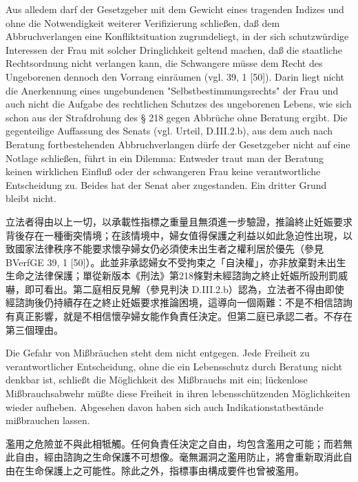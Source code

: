 \documentclass[12pt]{article}
\begin{document}
\begin{sourcepara}[title={原文SondervotumMS.296}]
Aus alledem darf der Gesetzgeber mit dem Gewicht eines tragenden Indizes und ohne die Notwendigkeit weiterer Verifizierung schließen, daß dem Abbruchverlangen eine Konfliktsituation zugrundeliegt, in der sich schutzwürdige Interessen der Frau mit solcher Dringlichkeit geltend machen, daß die staatliche Rechtsordnung nicht verlangen kann, die Schwangere müsse dem Recht des Ungeborenen dennoch den Vorrang einräumen (vgl. \abbrBVerfGE{} 39, 1 [50]). Darin liegt nicht die Anerkennung eines ungebundenen "Selbstbestimmungsrechts" der Frau und auch nicht die Aufgabe des rechtlichen Schutzes des ungeborenen Lebens, wie sich schon aus der Strafdrohung des § 218 \abbrStGB{} \abbrNF{} gegen Abbrüche ohne Beratung ergibt. Die gegenteilige Auffassung des Senats (vgl. Urteil, D.III.2.b), aus dem auch nach Beratung fortbestehenden Abbruchverlangen dürfe der Gesetzgeber nicht auf eine Notlage schließen, führt in ein Dilemma: Entweder traut man der Beratung keinen wirklichen Einfluß oder der schwangeren Frau keine verantwortliche Entscheidung zu. Beides hat der Senat aber zugestanden. Ein dritter Grund bleibt nicht.
\end{sourcepara}
\begin{transpara}
立法者得由以上一切，以承載性指標之重量且無須進一步驗證，推論終止妊娠要求背後存在一種衝突情境；在該情境中，婦女值得保護之利益以如此急迫性出現，以致國家法律秩序不能要求懷孕婦女仍必須使未出生者之權利居於優先（參見 BVerfGE 39, 1 [50]）。此並非承認婦女不受拘束之「自決權」，亦非放棄對未出生生命之法律保護；單從新版本《刑法》第218條對未經諮詢之終止妊娠所設刑罰威嚇，即可看出。第二庭相反見解（參見判決 D.III.2.b）認為，立法者不得由即使經諮詢後仍持續存在之終止妊娠要求推論困境，這導向一個兩難：不是不相信諮詢有真正影響，就是不相信懷孕婦女能作負責任決定。但第二庭已承認二者。不存在第三個理由。
\end{transpara}

\begin{sourcepara}[title={原文SondervotumMS.297}]
Die Gefahr von Mißbräuchen steht dem nicht entgegen. Jede Freiheit zu verantwortlicher Entscheidung, ohne die ein Lebensschutz durch Beratung nicht denkbar ist, schließt die Möglichkeit des Mißbrauchs mit ein; lückenlose Mißbrauchsabwehr müßte diese Freiheit in ihren lebensschützenden Möglichkeiten wieder aufheben. Abgesehen davon haben sich auch Indikationstatbestände mißbrauchen lassen.
\end{sourcepara}
\begin{transpara}
濫用之危險並不與此相牴觸。任何負責任決定之自由，均包含濫用之可能；而若無此自由，經由諮詢之生命保護不可想像。毫無漏洞之濫用防止，將會重新取消此自由在生命保護上之可能性。除此之外，指標事由構成要件也曾被濫用。
\end{transpara}
\end{document}
